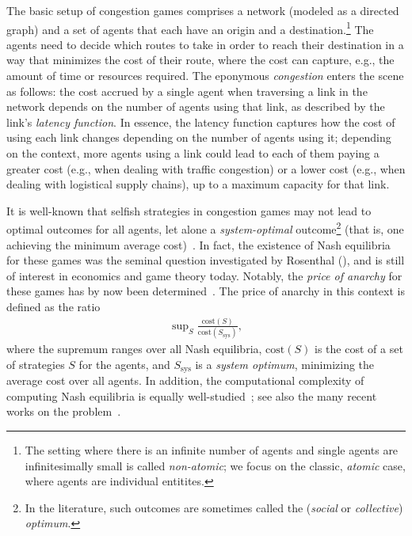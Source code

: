 \documentclass[letterpaper]{article} %
\begin{document}
The basic setup of congestion games comprises a network (modeled as a directed graph) and a set of agents that each have an origin and a destination.\footnote{The setting where there is an infinite number of agents and single agents are infinitesimally small is called \emph{non-atomic}; we focus on the classic, \emph{atomic} case, where agents are individual entitites.}
The agents need to decide which routes to take in order to reach their destination in a way that minimizes the cost of their route, where the cost can capture, e.g., the amount of time or resources required.
The eponymous \emph{congestion} enters the scene as follows: the cost accrued by a single agent when traversing a link in the network depends on the number of agents using that link, as described by the link's \emph{latency function}. In essence, the latency function captures how the cost of using each link changes depending on the number of agents using it; depending on the context, more agents using a link could lead to each of them paying a greater cost (e.g., when dealing with traffic congestion) or a lower cost (e.g., when dealing with logistical supply chains), up to a maximum capacity for that link.

It is well-known that selfish strategies in congestion games may not lead to optimal outcomes for all agents,
let alone a \emph{system-optimal} outcome\footnote{In the literature, such outcomes are sometimes called the (\emph{social} or \emph{collective}) \emph{optimum}.} (that is, one achieving the minimum average cost)~\cite{SharonARBS18}. 
In fact, the existence of Nash equilibria for these games was the seminal question investigated by Rosenthal  (\citeyear{Rosenthal73}), and is still of interest in economics and game theory today. 
Notably, the \emph{price of anarchy} for these games has by now been determined~\cite{ChristodoulouK05,AwerbuchAE05}. The price of anarchy in this context is defined as the ratio 
\begin{align} \label{eq:poa}
\tag{PoA}
\sup\nolimits_{S } \frac{\mathrm{cost}(S)}{\mathrm{cost}(S_{\mathrm{sys}})},
\end{align}
where the supremum ranges over all Nash equilibria, $\mathrm{cost}(S)$ is the cost of a set of strategies $S$ for the agents, and $S_{\mathrm{sys}}$ is a \emph{system optimum}, minimizing the average cost over all agents.
In addition, the computational complexity of computing Nash equilibria is equally well-studied~\cite{AckermannRV06,FabrikantPT04}; see also the many recent works on the problem~\cite{HarksHKMS22,0040XPRT22}. 
\end{document}

